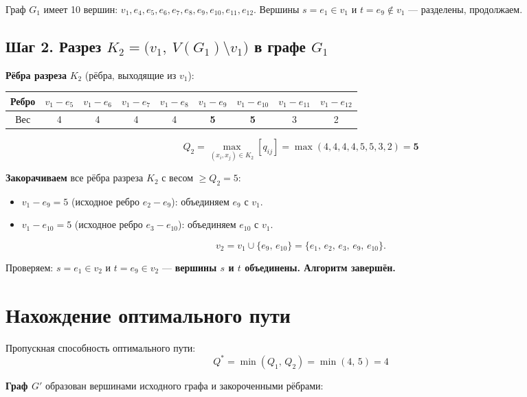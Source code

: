 \documentclass[a4paper,12pt]{article}
\begin{document}
Граф $G_1$ имеет 10 вершин: $v_1, e_4, e_5, e_6, e_7, e_8, e_9, e_{10}, e_{11}, e_{12}$.
Вершины $s = e_1 \in v_1$ и $t = e_9 \notin v_1$ --- разделены, продолжаем.

\subsection*{Шаг 2. Разрез $K_2 = \bigl(v_1,\ V(G_1) \setminus v_1\bigr)$ в графе $G_1$}

\textbf{Рёбра разреза} $K_2$ (рёбра, выходящие из $v_1$):

\begin{center}
	\renewcommand{\arraystretch}{1.2}
	\begin{tabular}{|c|c|c|c|c|c|c|c|c|}
		\hline
		Ребро & $v_1{-}e_5$ & $v_1{-}e_6$ & $v_1{-}e_7$ & $v_1{-}e_8$ & $v_1{-}e_9$ & $v_1{-}e_{10}$ & $v_1{-}e_{11}$ & $v_1{-}e_{12}$ \\
		\hline
		Вес   & 4           & 4           & 4           & 4           & \textbf{5}  & \textbf{5}     & 3              & 2              \\
		\hline
	\end{tabular}
\end{center}

\[
	Q_2 = \max_{(x_i,x_j)\in K_2}[q_{ij}] = \max(4,4,4,4,5,5,3,2) = \mathbf{5}
\]

\textbf{Закорачиваем} все рёбра разреза $K_2$ с весом $\geq Q_2 = 5$:
\begin{itemize}
	\item $v_1 - e_9 = 5$ (исходное ребро $e_2{-}e_9$): объединяем $e_9$ с $v_1$.
	\item $v_1 - e_{10} = 5$ (исходное ребро $e_3{-}e_{10}$): объединяем $e_{10}$ с $v_1$.
\end{itemize}

\[
	v_2 = v_1 \cup \{e_9,\,e_{10}\} = \{e_1,\,e_2,\,e_3,\,e_9,\,e_{10}\}.
\]

Проверяем: $s = e_1 \in v_2$ и $t = e_9 \in v_2$ --- \textbf{вершины $s$ и $t$ объединены. Алгоритм завершён.}

\section*{Нахождение оптимального пути}

Пропускная способность оптимального пути:
\[
	\boxed{Q^* = \min(Q_1,\, Q_2) = \min(4,\, 5) = 4}
\]

\textbf{Граф $G'$} образован вершинами исходного графа и закороченными рёбрами:
\end{document}
